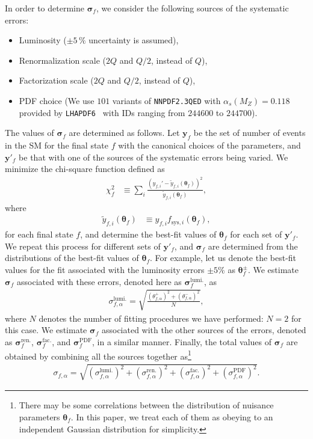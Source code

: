 \documentclass[12pt,twoside,book]{article}
\begin{document}
In order to determine $\bm{\sigma}_f$,
we consider the following sources of the systematic errors:
\begin{itemize}
 \item Luminosity ($\pm 5\,\%$ uncertainty is assumed),
 \item Renormalization scale ($2Q$ and $Q/2$, instead of $Q$),
 \item Factorization scale ($2Q$ and $Q/2$, instead of $Q$),
 \item PDF choice (We use $101$ variants of \texttt{NNPDF2.3QED} with
       $\alpha_s (M_Z) = 0.118$~\cite{Ball:2013hta} provided by
       \texttt{LHAPDF6}~\cite{Buckley:2014ana} with IDs ranging from
       $244600$ to $244700$).
\end{itemize}
The values of $\bm{\sigma}_f$ are determined as follows.  Let
$\bm{y}_f$ be the set of number of events in the SM for the final
state $f$ with the canonical choices of the parameters, and
$\bm{y}'_f$ be that with one of the sources of the systematic errors being
varied.  We minimize the chi-square function defined as
\begin{align}
 \chi^2_f &\equiv \sum_i \frac
 {\left( y_{f,i}' - \tilde{y}_{f,i} (\bm{\theta}_f) \right)^2}
 {\tilde{y}_{f,i} (\bm{\theta}_f)},
\end{align}
where
\begin{align}
 \tilde{y}_{f,i} (\bm{\theta}_f) &\equiv
 y_{f,i} f_{\mathrm{sys},i} (\bm{\theta}_f),
\end{align}
for each final state $f$, and determine the best-fit values of
$\bm{\theta}_f$ for each set of $\bm{y}'_f$.  We repeat this process for
different sets of $\bm{y}'_f$, and $\bm{\sigma}_f$ are determined from
the distributions of the best-fit values of $\bm{\theta}_f$.  For
example, let us denote the best-fit values for the fit associated with
the luminosity errors $\pm 5\%$ as $\bm{\theta}_f^{\pm}$.
We estimate $\bm{\sigma}_f$ associated with these errors, denoted here as
$\bm{\sigma}_f^{\mathrm{lumi.}}$, as
\begin{align}
 \sigma_{f,\alpha}^{\mathrm{lumi.}} = \sqrt{\frac{(\theta_{f,\alpha}^{+})^2 + (\theta_{f,\alpha}^{-})^2}{N}},
\end{align}
where $N$ denotes the number of fitting procedures we have performed:
$N=2$ for this case.
We estimate $\bm{\sigma}_f$ associated with
the other sources of the errors, denoted as
$\bm{\sigma}_f^{\mathrm{ren.}}$, $\bm{\sigma}_f^{\mathrm{fac.}}$, and
$\bm{\sigma}_f^{\mathrm{PDF}}$, in a similar manner.
Finally, the total values of $\bm{\sigma}_f$ are obtained by combining all the
sources together as\footnote{
There may be some correlations between the distribution of nuisance
parameters $\bm{\theta}_{f}$.  In this paper, we treat each of them as
obeying to an independent Gaussian distribution for simplicity.
}
\begin{align}
    \sigma_{f,\alpha} = \sqrt{(\sigma_{f,\alpha}^{\mathrm{lumi.}})^2
    + (\sigma_{f,\alpha}^{\mathrm{ren.}})^2
    + (\sigma_{f,\alpha}^{\mathrm{fac.}})^2
    + (\sigma_{f,\alpha}^{\mathrm{PDF}})^2}.
    \label{eq_comb_sig}
\end{align}
\end{document}

